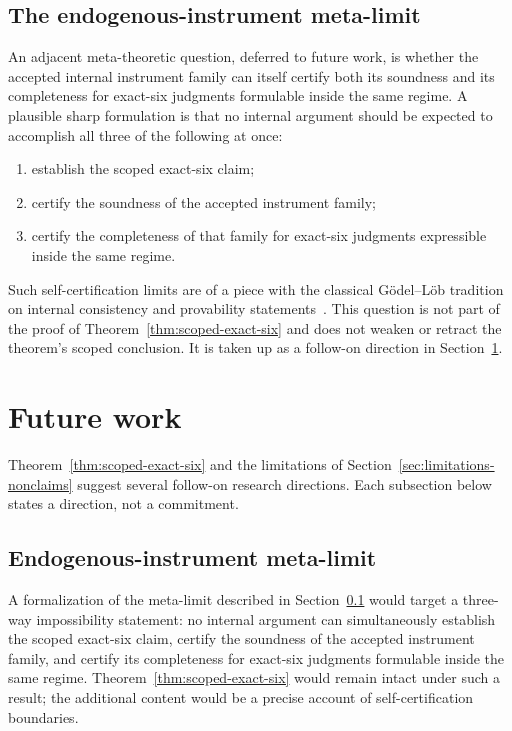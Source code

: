\documentclass[11pt]{article}
\theoremstyle{definition}
\begin{document}
\subsection{The endogenous-instrument meta-limit}\label{subsec:meta-limit}

An adjacent meta-theoretic question, deferred to future work, is
whether the accepted internal instrument family can itself certify
both its soundness and its completeness for exact-six judgments
formulable inside the same regime. A plausible sharp formulation is
that no internal argument should be expected to accomplish all three
of the following at once:
\begin{enumerate}[topsep=2pt,itemsep=1pt]
  \item establish the scoped exact-six claim;
  \item certify the soundness of the accepted instrument family;
  \item certify the completeness of that family for exact-six
    judgments expressible inside the same regime.
\end{enumerate}
Such self-certification limits are of a piece with the classical
G{\"o}del--L{\"o}b tradition on internal consistency and provability
statements~\citep{Godel1931,Lob1955}. This question is not part of
the proof of Theorem~\ref{thm:scoped-exact-six} and does not weaken
or retract the theorem's scoped conclusion. It is taken up as a
follow-on direction in Section~\ref{sec:future-work}.
 \section{Future work}\label{sec:future-work}



Theorem~\ref{thm:scoped-exact-six} and the limitations of
Section~\ref{sec:limitations-nonclaims} suggest several follow-on
research directions. Each subsection below states a direction, not a
commitment.

\subsection{Endogenous-instrument meta-limit}\label{subsec:future-meta-limit}

A formalization of the meta-limit described in
Section~\ref{subsec:meta-limit} would target a three-way
impossibility statement: no internal argument can simultaneously
establish the scoped exact-six claim, certify the soundness of the
accepted instrument family, and certify its completeness for
exact-six judgments formulable inside the same regime.
Theorem~\ref{thm:scoped-exact-six} would remain intact under such a
result; the additional content would be a precise account of
self-certification boundaries.
\end{document}
